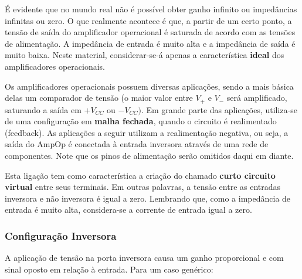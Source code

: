 \documentclass{article}
\numberwithin{equation}{section}
\begin{document}
É evidente que no mundo real não é possível obter ganho infinito ou impedâncias infinitas ou zero. O que realmente acontece é que, a partir de um certo ponto, a tensão de saída do amplificador operacional é saturada de acordo com as tensões de alimentação. A impedância de entrada é muito alta e a impedância de saída é muito baixa. Neste material, considerar-se-á apenas a característica \textbf{ideal} dos amplificadores operacionais.

Os amplificadores operacionais possuem diversas aplicações, sendo a mais básica delas um comparador de tensão (o maior valor entre $V_{+}$ e $V_{-}$ será amplificado, saturando a saída em $+V_{CC}$ ou $-V_{CC})$. Em grande parte das aplicações, utiliza-se de uma configuração em \textbf{malha fechada}, quando o circuito é realimentado (feedback). As aplicações a seguir utilizam a realimentação negativa, ou seja, a saída do AmpOp é conectada à entrada inversora através de uma rede de componentes. Note que os pinos de alimentação serão omitidos daqui em diante.

\begin{center}
\end{center}

Esta ligação tem como característica a criação do chamado \textbf{curto circuito virtual} entre seus terminais. Em outras palavras, a tensão entre as entradas inversora e não inversora é igual a zero. Lembrando que, como a impedância de entrada é muito alta, considera-se a corrente de entrada igual a zero.

\subsubsection{Configuração Inversora}
A aplicação de tensão na porta inversora causa um ganho proporcional e com sinal oposto em relação à entrada. Para um caso genérico:

\begin{center}
\end{center}
\end{document}

